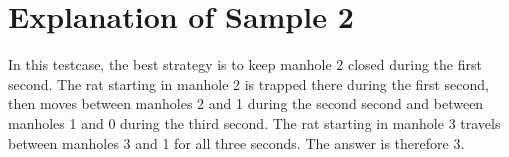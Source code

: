 \section*{Explanation of Sample 2}

In this testcase, the best strategy is to keep manhole 2 closed during the first second. The rat starting in
manhole 2 is trapped there during the first second, then moves between manholes 2 and 1 during the second
second and between manholes 1 and 0 during the third second.
The rat starting in manhole 3 travels between manholes 3 and 1 for all three seconds.
The answer is therefore 3.
